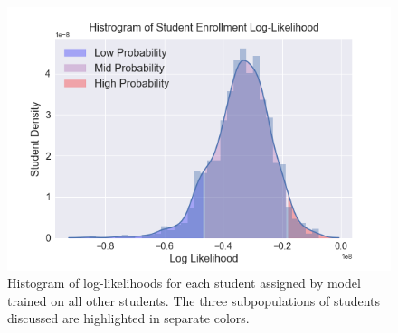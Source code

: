 \documentclass{edm_template}
\begin{document}
\begin{figure}
    \centering
    \includegraphics[scale=0.4]{figures/loglikelihood_hist.png}
    \caption{\label{fig:likelihistogram} Histogram of log-likelihoods for each student assigned by model trained on all other students. The three subpopulations of students discussed are highlighted in separate colors.}
\end{figure}
\end{document}
